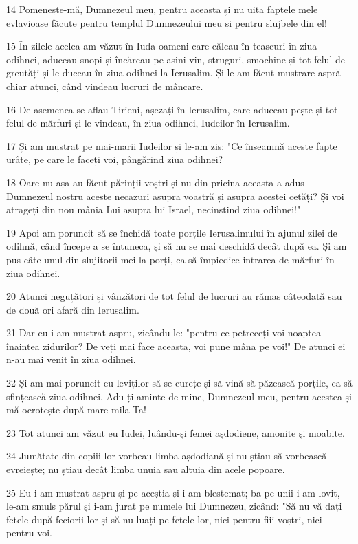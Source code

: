 \par 14 Pomenește-mă, Dumnezeul meu, pentru aceasta și nu uita faptele mele evlavioase făcute pentru templul Dumnezeului meu și pentru slujbele din el!
\par 15 În zilele acelea am văzut în Iuda oameni care călcau în teascuri în ziua odihnei, aduceau snopi și încărcau pe asini vin, struguri, smochine și tot felul de greutăți și le duceau în ziua odihnei la Ierusalim. Și le-am făcut mustrare aspră chiar atunci, când vindeau lucruri de mâncare.
\par 16 De asemenea se aflau Tirieni, așezați în Ierusalim, care aduceau pește și tot felul de mărfuri și le vindeau, în ziua odihnei, Iudeilor în Ierusalim.
\par 17 Și am mustrat pe mai-marii Iudeilor și le-am zis: "Ce înseamnă aceste fapte urâte, pe care le faceți voi, pângărind ziua odihnei?
\par 18 Oare nu așa au făcut părinții voștri și nu din pricina aceasta a adus Dumnezeul nostru aceste necazuri asupra voastră și asupra acestei cetăți? Și voi atrageți din nou mânia Lui asupra lui Israel, necinstind ziua odihnei!"
\par 19 Apoi am poruncit să se închidă toate porțile Ierusalimului în ajunul zilei de odihnă, când începe a se întuneca, și să nu se mai deschidă decât după ea. Și am pus câte unul din slujitorii mei la porți, ca să împiedice intrarea de mărfuri în ziua odihnei.
\par 20 Atunci neguțători și vânzători de tot felul de lucruri au rămas câteodată sau de două ori afară din Ierusalim.
\par 21 Dar eu i-am mustrat aspru, zicându-le: "pentru ce petreceți voi noaptea înaintea zidurilor? De veți mai face aceasta, voi pune mâna pe voi!" De atunci ei n-au mai venit în ziua odihnei.
\par 22 Și am mai poruncit eu leviților să se curețe și să vină să păzească porțile, ca să sfințească ziua odihnei. Adu-ți aminte de mine, Dumnezeul meu, pentru acestea și mă ocrotește după mare mila Ta!
\par 23 Tot atunci am văzut eu Iudei, luându-și femei așdodiene, amonite și moabite.
\par 24 Jumătate din copiii lor vorbeau limba așdodiană și nu știau să vorbească evreiește; nu știau decât limba unuia sau altuia din acele popoare.
\par 25 Eu i-am mustrat aspru și pe aceștia și i-am blestemat; ba pe unii i-am lovit, le-am smuls părul și i-am jurat pe numele lui Dumnezeu, zicând: "Să nu vă dați fetele după feciorii lor și să nu luați pe fetele lor, nici pentru fiii voștri, nici pentru voi.
